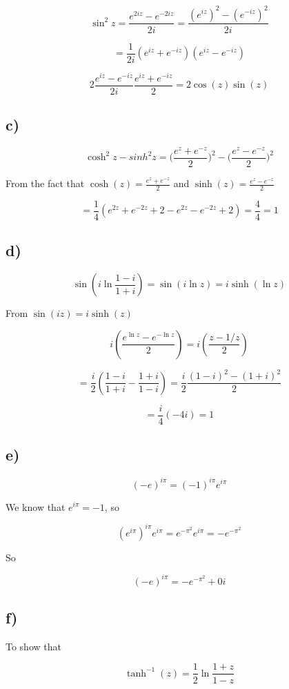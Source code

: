 \documentclass[a4paper,norsk, 10pt]{article}
\begin{document}
$$
\sin ^2 z = \frac{e^{2iz} - e^{-2iz}}{2i} = \frac{(e^{iz})^2 - (e^{-iz})^2}{2i}
$$

$$
= \frac{1}{2i} (e^{iz} + e^{-iz})(e^{iz}-e^{-iz}) 
$$

$$
2 \frac{e^{iz}-e^{-iz}}{2i} \frac{e^{iz}+e^{-iz}}{2} = 2\cos(z)\sin(z)
$$

\subsection*{c)}
$$
\cosh^2 z - sinh^2 z =  \big( \frac{e^{z} + e^{-z}}{2} \big) ^2 - \big( \frac{e^{z} - e^{-z}}{2} \big) ^2 
$$

From the fact that $\cosh(z) = \frac{e^{z} + e^{-z}}{2}$ and $\sinh(z) = \frac{e^{z} - e^{-z}}{2}$

$$
=\frac{1}{4} (e^{2z} + e^{-2z} + 2 - e^{2z} - e^{-2z} + 2) = \frac{4}{4} = 1
$$

\subsection*{d)}
$$
\sin(i \ln\frac{1-i}{1+i}) =  \sin(i \ln z) =  i \sinh (\ln z)
$$

From $\sin(i z) = i \sinh(z)$

$$
i \left( \frac{e^{\ln z} - e^{-\ln z}}{2} \right) = i \left(\frac{z-1/z}{2} \right)
$$

$$
= \frac{i}{2}\left( \frac{1-i}{1+i} - \frac{1+i}{1-i} \right) = \frac{i}{2}\frac{(1-i)^2 -(1+i)^2}{2} 
$$

$$
= \frac{i}{4}(-4i) = 1
$$

\subsection*{e)}

$$
(-e)^{i\pi} = (-1)^{i\pi}e^{i\pi}
$$

We know that $e^{i\pi} = -1$, so

$$
(e^{i\pi})^{i\pi}e^{i\pi} = e^{-\pi^2}e^{i\pi} = -e^{-\pi^2}
$$ 

So

$$
(-e)^{i\pi} = -e^{-\pi^2} + 0i
$$

\subsection*{f)}

To show that

$$
\tanh ^{-1} (z) = \frac{1}{2} \ln \frac{1+z}{1-z}
$$
\end{document}
